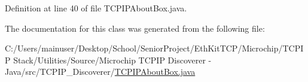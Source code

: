 Definition at line 40 of file T\+C\+P\+I\+P\+About\+Box.\+java.



The documentation for this class was generated from the following file\+:\begin{DoxyCompactItemize}
\item 
C\+:/\+Users/mainuser/\+Desktop/\+School/\+Senior\+Project/\+Eth\+Kit\+T\+C\+P/\+Microchip/\+T\+C\+P\+I\+P Stack/\+Utilities/\+Source/\+Microchip T\+C\+P\+I\+P Discoverer -\/ Java/src/\+T\+C\+P\+I\+P\+\_\+\+Discoverer/\hyperlink{_t_c_p_i_p_about_box_8java}{T\+C\+P\+I\+P\+About\+Box.\+java}\end{DoxyCompactItemize}

